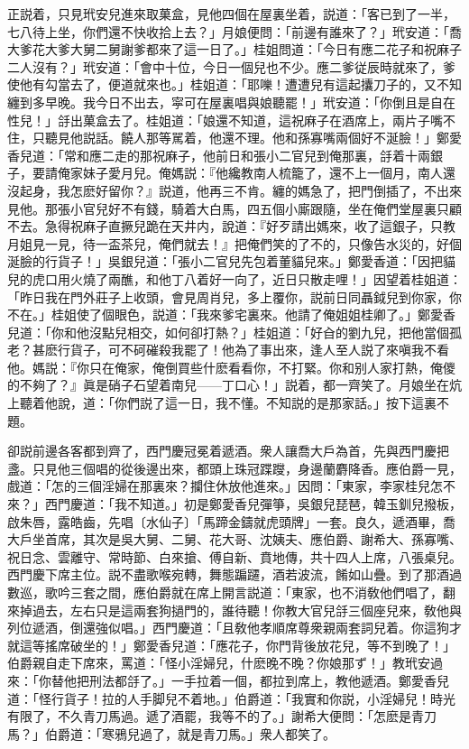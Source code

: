 正説着，只見玳安兒進來取菓盒，見他四個在屋裏坐着，説道：「客已到了一半，七八待上坐，你們還不快收拾上去？」月娘便問：「前邊有誰來了？」玳安道：「喬大爹花大爹大舅二舅謝爹都來了這一日了。」桂姐問道：「今日有應二花子和祝麻子二人沒有？」玳安道：「會中十位，今日一個兒也不少。應二爹従辰時就來了，爹使他有勾當去了，便道就來也。」桂姐道：「耶嚛！遭遭兒有這起攮刀子的，又不知纏到多早晚。我今日不出去，寜可在屋裏唱與娘聽罷！」玳安道：「你倒且是自在性兒！」㧱出菓盒去了。桂姐道：「娘還不知道，這祝麻子在酒席上，兩片子嘴不住，只聽見他説話。饒人那等駡着，他還不理。他和孫寡嘴兩個好不涎臉！」鄭愛香兒道：「常和應二走的那祝麻子，他前日和張小二官兒到俺那裏，㧱着十兩銀子，要請俺家妹子愛月兒。俺媽説：『他纔教南人梳籠了，還不上一個月，南人還沒起身，我怎麽好留你？』説道，他再三不肯。纏的媽急了，把門倒插了，不出來見他。那張小官兒好不有錢，騎着大白馬，四五個小廝跟隨，坐在俺們堂屋裏只顧不去。急得祝麻子直撅兒跪在天井内，說道：『好歹請出媽來，收了這銀子，只教月姐見一見，待一盃茶兒，俺們就去！』把俺們笑的了不的，只像告水災的，好個涎臉的行貨子！」吳銀兒道：「張小二官兒先包着董貓兒來。」鄭愛香道：「因把貓兒的虎口用火燒了兩醮，和他丁八着好一向了，近日只散走哩！」因望着桂姐道：「昨日我在門外莊子上收頭，會見周肖兒，多上覆你，説前日同聶鉞兒到你家，你不在。」桂姐使了個眼色，説道：「我來爹宅裏來。他請了俺姐姐桂卿了。」鄭愛香兒道：「你和他沒點兒相交，如何卻打熱？」桂姐道：「好㒲的劉九兒，把他當個孤老？甚麽行貨子，可不砢磪殺我罷了！他為了事出來，逢人至人説了來嗔我不看他。媽説：『你只在俺家，俺倒買些什麽看看你，不打緊。你和别人家打熱，俺儍的不夠了？』眞是硝子石望着南兒——丁口心！」説着，都一齊笑了。月娘坐在炕上聽着他說，道：「你們説了這一日，我不懂。不知説的是那家話。」按下這裏不題。

卻説前邊各客都到齊了，西門慶冠冕着遞酒。衆人讓喬大戶為首，先與西門慶把盞。只見他三個唱的從後邊出來，都頭上珠冠蹀躞，身邊蘭麝降香。應伯爵一見，戲道：「怎的三個淫婦在那裏來？攔住休放他進來。」因問：「東家，李家桂兒怎不來？」西門慶道：「我不知道。」初是鄭愛香兒彈箏，吳銀兒琵琶，韓玉釧兒撥板，啟朱唇，露皓齒，先唱〔水仙子〕「馬蹄金鑄就虎頭牌」一套。良久，遞酒畢，喬大戶坐首席，其次是吳大舅、二舅、花大哥、沈姨夫、應伯爵、謝希大、孫寡嘴、祝日念、雲離守、常時節、白來搶、傅自新、賁地傳，共十四人上席，八張桌兒。西門慶下席主位。説不盡歌喉宛轉，舞態蹁躚，酒若波流，餚如山疊。到了那酒過數巡，歌吟三套之間，應伯爵就在席上開言説道：「東家，也不消敎他們唱了，翻來掉過去，左右只是這兩套狗撾門的，誰待聽！你教大官兒㧱三個座兒來，敎他與列位遞酒，倒還強似唱。」西門慶道：「且敎他孝順席尊衆親兩套詞兒着。你這狗才就這等搖席破坐的！」鄭愛香兒道：「應花子，你門背後放花兒，等不到晚了！」伯爵親自走下席來，罵道：「怪小淫婦兒，什麽晚不晚？你娘那ず！」教玳安過來：「你替他把刑法都㧱了。」一手拉着一個，都拉到席上，教他遞酒。鄭愛香兒道：「怪行貨子！拉的人手脚兒不着地。」伯爵道：「我實和你説，小淫婦兒！時光有限了，不久青刀馬過。遞了酒罷，我等不的了。」謝希大便問：「怎麽是青刀馬？」伯爵道：「寒鴉兒過了，就是青刀馬。」衆人都笑了。

